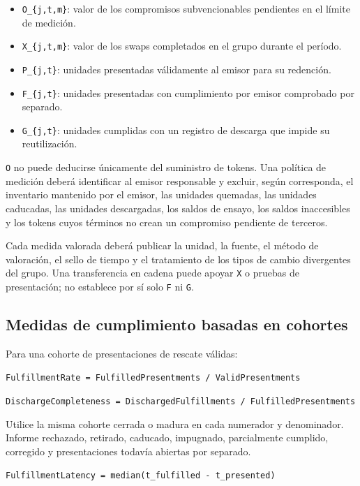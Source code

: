 \documentclass[11pt]{article}
\begin{document}
\begin{itemize}[leftmargin=*]
\item \texttt{O\_\{j,t,m\}}: valor de los compromisos subvencionables pendientes en el límite de medición.
\item \texttt{X\_\{j,t,m\}}: valor de los swaps completados en el grupo durante el período.
\item \texttt{P\_\{j,t\}}: unidades presentadas válidamente al emisor para su redención.
\item \texttt{F\_\{j,t\}}: unidades presentadas con cumplimiento por emisor comprobado por separado.
\item \texttt{G\_\{j,t\}}: unidades cumplidas con un registro de descarga que impide su reutilización.
\end{itemize}
\texttt{O} no puede deducirse únicamente del suministro de tokens. Una política de medición deberá identificar al emisor responsable y excluir, según corresponda, el inventario mantenido por el emisor, las unidades quemadas, las unidades caducadas, las unidades descargadas, los saldos de ensayo, los saldos inaccesibles y los tokens cuyos términos no crean un compromiso pendiente de terceros.

Cada medida valorada deberá publicar la unidad, la fuente, el método de valoración, el sello de tiempo y el tratamiento de los tipos de cambio divergentes del grupo. Una transferencia en cadena puede apoyar \texttt{X} o pruebas de presentación; no establece por sí solo \texttt{F} ni \texttt{G}.

\subsection*{Medidas de cumplimiento basadas en cohortes}

Para una cohorte de presentaciones de rescate válidas:

\texttt{FulfillmentRate = FulfilledPresentments / ValidPresentments}

\texttt{DischargeCompleteness = DischargedFulfillments / FulfilledPresentments}

Utilice la misma cohorte cerrada o madura en cada numerador y denominador. Informe rechazado, retirado, caducado, impugnado, parcialmente cumplido, corregido y presentaciones todavía abiertas por separado.

\texttt{FulfillmentLatency = median(t\_fulfilled - t\_presented)}
\end{document}
